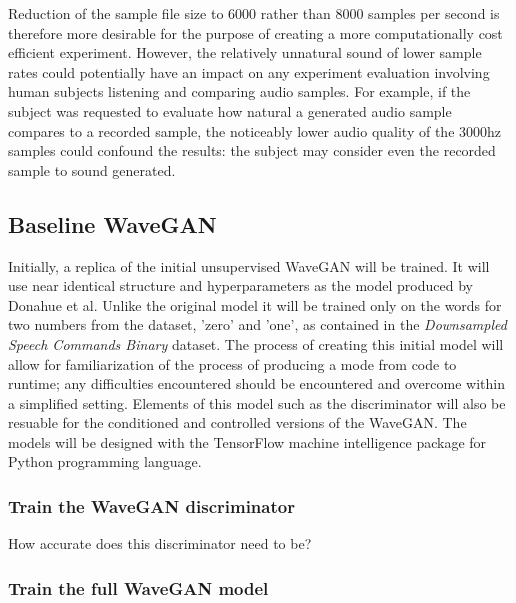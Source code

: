 \documentclass[a4paper, titlepage]{article}
\begin{document}
\newline
\newline
Reduction of the sample file size to 6000 rather than 8000 samples per second is therefore more desirable for the purpose of creating a more computationally cost efficient experiment.
However, the relatively unnatural sound of lower sample rates could potentially have an impact on any experiment evaluation involving human subjects listening and comparing audio samples.
For example, if the subject was requested to evaluate how natural a generated audio sample compares to a recorded sample, the noticeably lower audio quality of the 3000hz samples could confound the results: the subject may consider even the recorded sample to sound generated.

\subsection{Baseline WaveGAN}

Initially, a replica of the initial unsupervised WaveGAN will be trained.
It will use near identical structure and hyperparameters as the model produced by Donahue et al.
Unlike the original model it will be trained only on the words for two numbers from the dataset, 'zero' and 'one', as contained in the \textit{Downsampled Speech Commands Binary} dataset.
\newline
\newline
The process of creating this initial model will allow for familiarization of the process of producing a mode from code to runtime; any difficulties encountered should be encountered and overcome within a simplified setting.
Elements of this model such as the discriminator will also be resuable for the conditioned and controlled versions of the WaveGAN.
\newline
\newline
The models will be designed with the TensorFlow machine intelligence package for Python programming language.

\subsubsection{Train the WaveGAN discriminator}

How accurate does this discriminator need to be?

\subsubsection{Train the full WaveGAN model}
\end{document}
